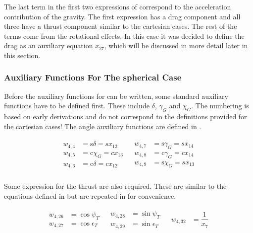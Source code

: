 \noindent
The last term in the first two expressions of  correspond to the acceleration contribution of the gravity. The first expression has a drag component and all three have a thrust component similar to the cartesian cases. The rest of the terms come from the rotational effects. In this case it was decided to define the drag as an auxiliary equation $x_{27}$, which will be discussed in more detail later in this section.

\subsubsection{Auxiliary Functions For The spherical Case}
\label{subsubsec:auxFspher}
Before the auxiliary functions for  can be written, some standard auxiliary functions have to be defined first. These include $\delta$, $\gamma_{G}$ and $\chi_{G}$. The numbering is based on early derivations and do not correspond to the definitions provided for the cartesian cases! The angle auxiliary functions are defined in .

\begin{align} \label{eq:SpherAnglF}
\begin{split}
w_{4,4} &= \text{s}\delta = s x_{12}  \\
w_{4,5} &= \text{c}\chi_{G} = c x_{13} \\
w_{4,6} &= \text{c}\delta = c x_{12} \\
\end{split}
&
\begin{split}
w_{4,7} &= \text{s}\gamma_{G} = s x_{14} \\
w_{4,8} &= \text{c}\gamma_{G} = c x_{14} \\
w_{4,9} &= \text{s}\chi_{G} = s x_{13} \\
\end{split}
\end{align}

\noindent
Some expression for the thrust are also required. These are similar to the equations defined in  but are repeated in  for convenience. 

\begin{align} \label{eq:thrustAuxF}
\begin{split}
w_{4,26} &= \cos \psi_{T} \\
w_{4,27} &= \cos \epsilon_{T} \\
\end{split}
&
\begin{split}
w_{4,28} &= \sin \psi_{T} \\
w_{4,29} &= \sin \epsilon_{T} \\
\end{split}
&
\begin{split}
w_{4,32} &= \dfrac{1}{x_{7}} \\
\end{split}
\end{align}


